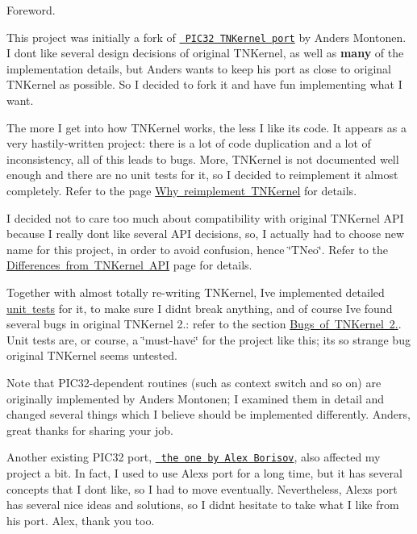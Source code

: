 Foreword.

This project was initially a fork of \href{https://github.com/andersm/TNKernel-PIC32}{\texttt{ P\+I\+C32 T\+N\+Kernel port}} by Anders Montonen. I don\textquotesingle{}t like several design decisions of original T\+N\+Kernel, as well as {\bfseries{many}} of the implementation details, but Anders wants to keep his port as close to original T\+N\+Kernel as possible. So I decided to fork it and have fun implementing what I want.

The more I get into how T\+N\+Kernel works, the less I like its code. It appears as a very hastily-\/written project\+: there is a lot of code duplication and a lot of inconsistency, all of this leads to bugs. More, T\+N\+Kernel is not documented well enough and there are no unit tests for it, so I decided to reimplement it almost completely. Refer to the page \mbox{\hyperlink{why_reimplement}{Why reimplement T\+N\+Kernel}} for details.

I decided not to care too much about compatibility with original T\+N\+Kernel A\+PI because I really don\textquotesingle{}t like several A\+PI decisions, so, I actually had to choose new name for this project, in order to avoid confusion, hence \char`\"{}\+T\+Neo\char`\"{}. Refer to the \mbox{\hyperlink{tnkernel_diff}{Differences from T\+N\+Kernel A\+PI}} page for details.

Together with almost totally re-\/writing T\+N\+Kernel, I\textquotesingle{}ve implemented detailed \mbox{\hyperlink{unit_tests}{unit tests}} for it, to make sure I didn\textquotesingle{}t break anything, and of course I\textquotesingle{}ve found several bugs in original T\+N\+Kernel 2.\+: refer to the section \mbox{\hyperlink{why_reimplement_why_reimplement__bugs}{Bugs of T\+N\+Kernel 2.}}. Unit tests are, or course, a \char`\"{}must-\/have\char`\"{} for the project like this; it\textquotesingle{}s so strange bug original T\+N\+Kernel seems untested.

Note that P\+I\+C32-\/dependent routines (such as context switch and so on) are originally implemented by Anders Montonen; I examined them in detail and changed several things which I believe should be implemented differently. Anders, great thanks for sharing your job.

Another existing P\+I\+C32 port, \href{http://www.tnkernel.com/tn_port_pic24_dsPIC_PIC32.html}{\texttt{ the one by Alex Borisov}}, also affected my project a bit. In fact, I used to use Alex\textquotesingle{}s port for a long time, but it has several concepts that I don\textquotesingle{}t like, so I had to move eventually. Nevertheless, Alex\textquotesingle{}s port has several nice ideas and solutions, so I didn\textquotesingle{}t hesitate to take what I like from his port. Alex, thank you too.

